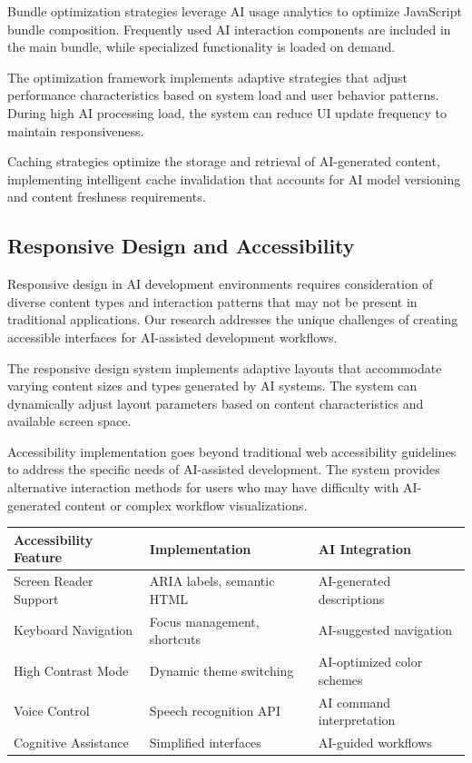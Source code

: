 Bundle optimization strategies leverage AI usage analytics to optimize JavaScript bundle composition. Frequently used AI interaction components are included in the main bundle, while specialized functionality is loaded on demand.

The optimization framework implements adaptive strategies that adjust performance characteristics based on system load and user behavior patterns. During high AI processing load, the system can reduce UI update frequency to maintain responsiveness.

Caching strategies optimize the storage and retrieval of AI-generated content, implementing intelligent cache invalidation that accounts for AI model versioning and content freshness requirements.

\subsection*{Responsive Design and Accessibility}

Responsive design in AI development environments requires consideration of diverse content types and interaction patterns that may not be present in traditional applications. Our research addresses the unique challenges of creating accessible interfaces for AI-assisted development workflows.

The responsive design system implements adaptive layouts that accommodate varying content sizes and types generated by AI systems. The system can dynamically adjust layout parameters based on content characteristics and available screen space.

Accessibility implementation goes beyond traditional web accessibility guidelines to address the specific needs of AI-assisted development. The system provides alternative interaction methods for users who may have difficulty with AI-generated content or complex workflow visualizations.

\begin{center}
\begin{tabular}{@{}lll@{}}
\toprule
\textbf{Accessibility Feature} & \textbf{Implementation} & \textbf{AI Integration} \\
\midrule
Screen Reader Support & ARIA labels, semantic HTML & AI-generated descriptions \\
Keyboard Navigation & Focus management, shortcuts & AI-suggested navigation \\
High Contrast Mode & Dynamic theme switching & AI-optimized color schemes \\
Voice Control & Speech recognition API & AI command interpretation \\
Cognitive Assistance & Simplified interfaces & AI-guided workflows \\
\bottomrule
\end{tabular}
\end{center}


